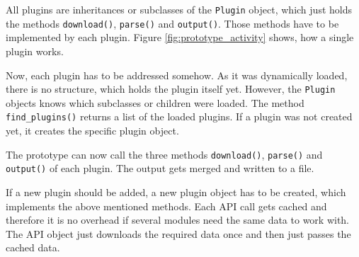All plugins are inheritances or subclasses of the \texttt{Plugin} object, which
just holds the methods \texttt{download()}, \texttt{parse()} and
\texttt{output()}. Those methods have to be implemented by each plugin. Figure
\ref{fig:prototype_activity} shows, how a single plugin works.

Now, each plugin has to be addressed somehow. As it was dynamically loaded,
there is no structure, which holds the plugin itself yet. However, the
\texttt{Plugin} objects knows which subclasses or children were loaded. The
method \texttt{find\_plugins()} returns a list of the loaded plugins. If a
plugin was not created yet, it creates the specific plugin object.

The prototype can now call the three methods \texttt{download()},
\texttt{parse()} and \texttt{output()} of each plugin. The output gets merged
and written to a file.

If a new plugin should be added, a new plugin object has to be created, which
implements the above mentioned methods. Each API call gets cached and therefore
it is no overhead if several modules need the same data to work with. The API
object just downloads the required data once and then just passes the cached
data.

